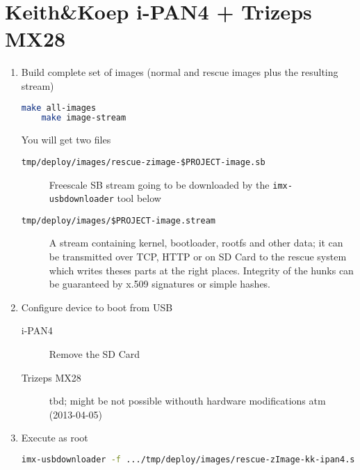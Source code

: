 \section{Keith\&Koep i-PAN4 + Trizeps MX28}

\begin{enumerate}
\item Build complete set of images (normal and rescue images plus the
  resulting stream)
  \begin{lstlisting}[language=sh]
    make all-images
    make image-stream
  \end{lstlisting}
  You will get two files
  \begin{description}
  \item [\texttt{tmp/deploy/images/rescue-zimage-\$PROJECT-image.sb}]
    Freescale SB stream going to be downloaded by the
    \texttt{imx-usbdownloader} tool below
  \item [\texttt{tmp/deploy/images/\$PROJECT-image.stream}] A stream
    containing kernel, bootloader, rootfs and other data; it can be
    transmitted over TCP, HTTP or on SD Card to the rescue system
    which writes theses parts at the right places.  Integrity of the
    hunks can be guaranteed by x.509 signatures or simple hashes.
  \end{description}
\item Configure device to boot from USB
  \begin{description}
  \item[i-PAN4] Remove the SD Card
  \item[Trizeps MX28] tbd; might be not possible withouth hardware
    modifications atm (2013-04-05)
  \end{description}
\item Execute as root
  \begin{lstlisting}[language=sh]
    imx-usbdownloader -f .../tmp/deploy/images/rescue-zImage-kk-ipan4.sb
  \end{lstlisting}


\end{enumerate}
